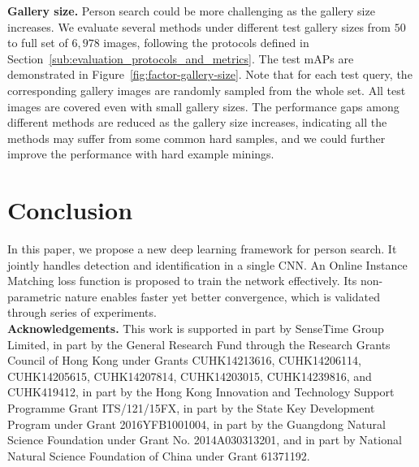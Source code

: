 \documentclass[10pt,twocolumn,letterpaper]{article}
\begin{document}
\textbf{Gallery size.} Person search could be more challenging as the gallery size increases. We evaluate several methods under different test gallery sizes from $50$ to full set of $6,978$ images, following the protocols defined in Section~\ref{sub:evaluation_protocols_and_metrics}. The test mAPs are demonstrated in Figure~\ref{fig:factor-gallery-size}. Note that for each test query, the corresponding gallery images are randomly sampled from the whole set. All test images are covered even with small gallery sizes. The performance gaps among different methods are reduced as the gallery size increases, indicating all the methods may suffer from some common hard samples, and we could further improve the performance with hard example minings.

\section{Conclusion} %
\label{sec:conclusion}
In this paper, we propose a new deep learning framework for person search. It jointly handles detection and identification in a single CNN. An Online Instance Matching loss function is proposed to train the network effectively. Its non-parametric nature enables faster yet better convergence, which is validated through series of experiments.\\

\noindent\textbf{Acknowledgements.} This work is supported in part by SenseTime Group Limited, in part by the General Research Fund through the Research Grants Council of Hong Kong under Grants CUHK14213616, CUHK14206114, CUHK14205615, CUHK14207814, CUHK14203015, CUHK14239816, and CUHK419412, in part by the Hong Kong Innovation and Technology Support Programme Grant ITS/121/15FX, in part by the State Key Development Program under Grant 2016YFB1001004, in part by the Guangdong Natural Science Foundation under Grant No. 2014A030313201, and in part by National Natural Science Foundation of China under Grant 61371192.

{\small


}
\end{document}
